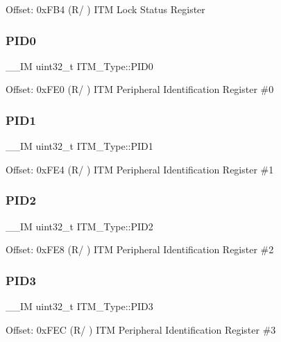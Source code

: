 Offset\+: 0x\+F\+B4 (R/ ) I\+TM Lock Status Register \mbox{\label{struct_i_t_m___type_ab4a4cc97ad658e9c46cf17490daffb8a}} 
\subsubsection{\texorpdfstring{PID0}{PID0}}
{\footnotesize\ttfamily \+\_\+\+\_\+\+IM uint32\+\_\+t I\+T\+M\+\_\+\+Type\+::\+P\+I\+D0}

Offset\+: 0x\+F\+E0 (R/ ) I\+TM Peripheral Identification Register \#0 \mbox{\label{struct_i_t_m___type_a89ea1d805a668d6589b22d8e678eb6a4}} 
\subsubsection{\texorpdfstring{PID1}{PID1}}
{\footnotesize\ttfamily \+\_\+\+\_\+\+IM uint32\+\_\+t I\+T\+M\+\_\+\+Type\+::\+P\+I\+D1}

Offset\+: 0x\+F\+E4 (R/ ) I\+TM Peripheral Identification Register \#1 \mbox{\label{struct_i_t_m___type_a8471c4d77b7107cf580587509da69f38}} 
\subsubsection{\texorpdfstring{PID2}{PID2}}
{\footnotesize\ttfamily \+\_\+\+\_\+\+IM uint32\+\_\+t I\+T\+M\+\_\+\+Type\+::\+P\+I\+D2}

Offset\+: 0x\+F\+E8 (R/ ) I\+TM Peripheral Identification Register \#2 \mbox{\label{struct_i_t_m___type_af317d5e2d946d70e6fb67c02b92cc8a3}} 
\subsubsection{\texorpdfstring{PID3}{PID3}}
{\footnotesize\ttfamily \+\_\+\+\_\+\+IM uint32\+\_\+t I\+T\+M\+\_\+\+Type\+::\+P\+I\+D3}

Offset\+: 0x\+F\+EC (R/ ) I\+TM Peripheral Identification Register \#3 \mbox{\label{struct_i_t_m___type_aad5e11dd4baf6d941bd6c7450f60a158}} 
